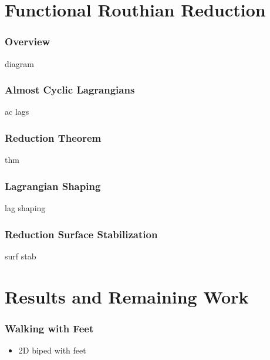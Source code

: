 \documentclass{beamer}
\begin{document}
\section{Functional Routhian Reduction}
\begin{frame}
  \frametitle{Overview}
  diagram
\end{frame}

\begin{frame}
  \frametitle{Almost Cyclic Lagrangians}
  ac lags
\end{frame}

\begin{frame}
  \frametitle{Reduction Theorem}
  thm
\end{frame}

\begin{frame}
  \frametitle{Lagrangian Shaping}
  lag shaping
\end{frame}

\begin{frame}
  \frametitle{Reduction Surface Stabilization}
  surf stab
\end{frame}

\section{Results and Remaining Work}
\begin{frame}
  \frametitle{Walking with Feet}
  \begin{itemize}
  \item 2D biped with feet
  \end{itemize}
\end{frame}


%
%
%
\end{document}
